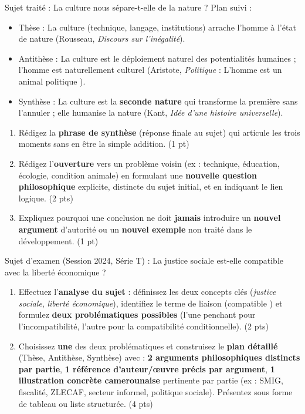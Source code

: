 \documentclass[11pt]{article}
\begin{document}
\begin{exercice}
Sujet traité : \og La culture nous sépare-t-elle de la nature ? \fg{}
Plan suivi :
\begin{itemize}
    \item Thèse : La culture (technique, langage, institutions) arrache l'homme à l'état de nature (Rousseau, \textit{Discours sur l'inégalité}).
    \item Antithèse : La culture est le déploiement naturel des potentialités humaines ; l'homme est \og naturellement culturel \fg{} (Aristote, \textit{Politique} : \og L'homme est un animal politique \fg{}).
    \item Synthèse : La culture est la \textbf{seconde nature} qui transforme la première sans l'annuler ; elle humanise la nature (Kant, \textit{Idée d'une histoire universelle}).
\end{itemize}
\begin{enumerate}
    \item Rédigez la \textbf{phrase de synthèse} (réponse finale au sujet) qui articule les trois moments sans en être la simple addition. (1 pt)
    \item Rédigez l'\textbf{ouverture} vers un problème voisin (ex : technique, éducation, écologie, condition animale) en formulant une \textbf{nouvelle question philosophique} explicite, distincte du sujet initial, et en indiquant le lien logique. (2 pts)
    \item Expliquez pourquoi une conclusion ne doit \textbf{jamais} introduire un \textbf{nouvel argument} d'autorité ou un \textbf{nouvel exemple} non traité dans le développement. (1 pt)
\end{enumerate}
\end{exercice}

\begin{exercice}
Sujet d'examen (Session 2024, Série T) : \og La justice sociale est-elle compatible avec la liberté économique ? \fg{}
\begin{enumerate}
    \item Effectuez l'\textbf{analyse du sujet} : définissez les deux concepts clés (\textit{justice sociale}, \textit{liberté économique}), identifiez le terme de liaison (\og compatible \fg{}) et formulez \textbf{deux problématiques possibles} (l'une penchant pour l'incompatibilité, l'autre pour la compatibilité conditionnelle). (2 pts)
    \item Choisissez \textbf{une} des deux problématiques et construisez le \textbf{plan détaillé} (Thèse, Antithèse, Synthèse) avec : \textbf{2 arguments philosophiques distincts par partie}, \textbf{1 référence d'auteur/œuvre précis par argument}, \textbf{1 illustration concrète camerounaise} pertinente par partie (ex : SMIG, fiscalité, ZLECAF, secteur informel, politique sociale). Présentez sous forme de tableau ou liste structurée. (4 pts)
\end{enumerate}
\end{exercice}
\end{document}
